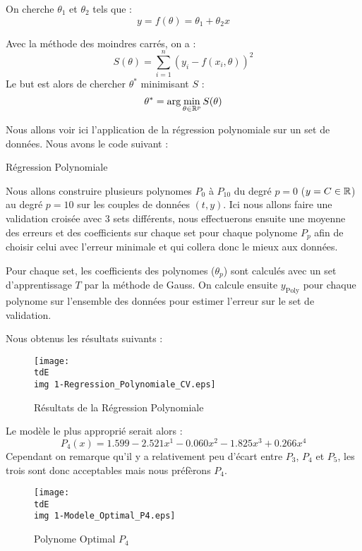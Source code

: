 		\begin{ex}
			On cherche $\theta_1$ et $\theta_2$ tels que :
			$$
				y = f(\theta) = \theta_1 + \theta_2 x
			$$
			
			Avec la méthode des moindres carrés, on a :
			$$
				S(\theta) = \sum_{i=1}^n \left( y_i - f(x_i, \theta) \right)^2
			$$
			Le but est alors de chercher $\theta^*$ minimisant $S$ \ie :
			$$
				\theta^* = \arg \min_{\theta \in \mathbb{R}^p} S(\theta)
			$$
		\end{ex}


		Nous allons voir ici l'application de la régression polynomiale sur un set de données. Nous avons le code suivant :

		\begin{listing}[H]
			\caption{Régression Polynomiale}
			\label{code-5-regPoly}
		\end{listing}

		Nous allons construire plusieurs polynomes $P_0$ à $P_{10}$ du degré $p=0$ ($y=C\in\mathbb{R}$) au degré $p=10$ sur les couples de données $(t,y)$. Ici nous allons faire une validation croisée avec 3 sets différents, nous effectuerons ensuite une moyenne des erreurs et des coefficients sur chaque set pour chaque polynome $P_p$ afin de choisir celui avec l'erreur minimale et qui collera donc le mieux aux données.

		Pour chaque set, les coefficients des polynomes ($\theta_p$) sont calculés avec un set d'apprentissage $T$ par la méthode de Gauss. On calcule ensuite $y_\text{Poly}$ pour chaque polynome sur l'ensemble des données pour estimer l'erreur sur le set de validation.

		Nous obtenus les résultats suivants :

		\begin{figure}[H]
			\centering
			\texttt{[image: \\tdE\\img 1-Regression\_Polynomiale\_CV.eps]}
			\caption{Résultats de la Régression Polynomiale}
			\label{img-5-regPoly}
		\end{figure}

		Le modèle le plus approprié serait alors :
		$$
			P_4(x) = 1.599 -2.521 x^1 -0.060 x^2 -1.825 x^3 + 0.266 x^4
		$$
		Cependant on remarque qu'il y a relativement peu d'écart entre $P_3$, $P_4$ et $P_5$, les trois sont donc acceptables mais nous préfèrons $P_4$.

		\begin{figure}[H]
			\centering
			\texttt{[image: \\tdE\\img 1-Modele\_Optimal\_P4.eps]}
			\caption{Polynome Optimal $P_4$}
			\label{img-5-modeleOptimalReg}
		\end{figure}



